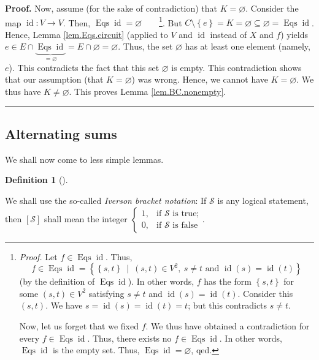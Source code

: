 \documentclass[numbers=enddot,12pt,final,onecolumn,notitlepage]{scrartcl}%
\theoremstyle{definition}
\newtheorem{defi}[theo]{Definition}
\newenvironment{definition}[1][]
{\begin{defi}[#1]\begin{leftbar}}
{\end{leftbar}\end{defi}}
\newenvironment{proof}[1][Proof]{\noindent\textbf{#1.} }{\ \rule{0.5em}{0.5em}}
\newenvironment{verlong}{}{}
\begin{document}
\begin{verlong}
\begin{proof}
Now, assume (for the sake of contradiction) that $K=\varnothing$. Consider the
map $\operatorname*{id}:V\rightarrow V$. Then, $\operatorname*{Eqs}%
\operatorname*{id}=\varnothing$\ \ \ \ \footnote{\textit{Proof.} Let
$f\in\operatorname*{Eqs}\operatorname*{id}$. Thus,%
\begin{equation}
f\in\operatorname*{Eqs}\operatorname*{id}=\left\{  \left\{  s,t\right\}
\ \mid\ \left(  s,t\right)  \in V^{2},\ s\neq t\text{ and }\operatorname*{id}%
\left(  s\right)  =\operatorname*{id}\left(  t\right)  \right\} \nonumber
\end{equation}
(by the definition of $\operatorname*{Eqs}\operatorname*{id}$). In other
words, $f$ has the form $\left\{  s,t\right\}  $ for some $\left(  s,t\right)
\in V^{2}$ satisfying $s\neq t$ and $\operatorname*{id}\left(  s\right)
=\operatorname*{id}\left(  t\right)  $. Consider this $\left(  s,t\right)  $.
We have $s=\operatorname*{id}\left(  s\right)  =\operatorname*{id}\left(
t\right)  =t$; but this contradicts $s\neq t$.
\par
Now, let us forget that we fixed $f$. We thus have obtained a contradiction
for every $f\in\operatorname*{Eqs}\operatorname*{id}$. Thus, there exists no
$f\in\operatorname*{Eqs}\operatorname*{id}$. In other words,
$\operatorname*{Eqs}\operatorname*{id}$ is the empty set. Thus,
$\operatorname*{Eqs}\operatorname*{id}=\varnothing$, qed.}. But $C\setminus
\left\{  e\right\}  =K=\varnothing\subseteq\varnothing=\operatorname*{Eqs}%
\operatorname*{id}$. Hence, Lemma \ref{lem.Eqs.circuit} (applied to $V$ and
$\operatorname*{id}$ instead of $X$ and $f$) yields $e\in E\cap
\underbrace{\operatorname*{Eqs}\operatorname*{id}}_{=\varnothing}%
=E\cap\varnothing=\varnothing$. Thus, the set $\varnothing$ has at least one
element (namely, $e$). This contradicts the fact that this set $\varnothing$
is empty. This contradiction shows that our assumption (that $K=\varnothing$)
was wrong. Hence, we cannot have $K=\varnothing$. We thus have $K\neq
\varnothing$. This proves Lemma \ref{lem.BC.nonempty}.
\end{proof}
\end{verlong}

\subsection{Alternating sums}

We shall now come to less simple lemmas.

\begin{definition}
\label{def.iverson}We shall use the so-called \textit{Iverson bracket
notation}: If $\mathcal{S}$ is any logical statement, then $\left[
\mathcal{S}\right]  $ shall mean the integer $%
\begin{cases}
1, & \text{if }\mathcal{S}\text{ is true;}\\
0, & \text{if }\mathcal{S}\text{ is false}%
\end{cases}
$.
\end{definition}
\end{document}
